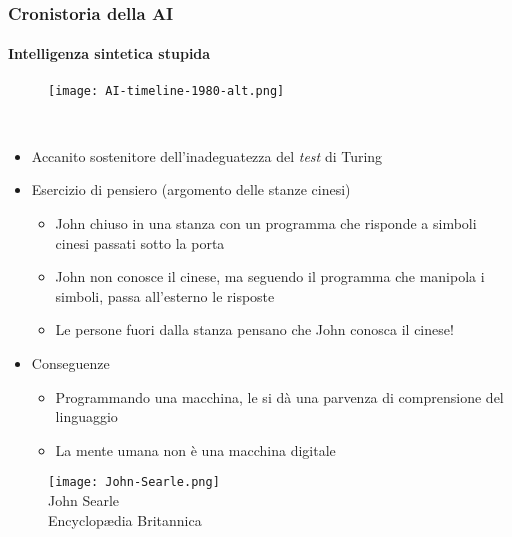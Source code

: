 %
\begin{frame}[t] \frametitle{Cronistoria della AI}
{\scriptsize
{}
\framesubtitle{Intelligenza sintetica stupida}
\vspace*{-.5cm}
	\begin{minipage}[t]{\textwidth}
		\begin{figure}[ht]
			\centering
			\texttt{[image: AI-timeline-1980-alt.png]}
		\end{figure}
	\end{minipage}
	\\\vspace*{.3cm}
	\begin{minipage}[t]{\textwidth}
		\begin{minipage}[t]{0.6\textwidth}
			\begin{itemize}[leftmargin=10pt,align=right]
				\onslide<2->\item[\alert{\faHandORight}] Accanito sostenitore dell'inadeguatezza del \emph{test} di Turing
				\onslide<3->\item[\alert{\faHandORight}] Esercizio di pensiero (\alert{argomento delle stanze cinesi})
				\onslide<4->\begin{itemize}[leftmargin=10pt,align=right]
								\item[\alert{\faHandORight}] John chiuso in una stanza con un programma che risponde a simboli cinesi passati sotto la porta
								\item[\alert{\faHandORight}] John non conosce il cinese, ma seguendo il programma che manipola i simboli, passa all'esterno le risposte
								\item[\alert{\faHandORight}] Le persone fuori dalla stanza pensano che John conosca il cinese!
				\end{itemize}
				\item[\alert{\faHandORight}] Conseguenze
				\begin{itemize}[leftmargin=10pt,align=right]
					\item[\alert{\faHandORight}] Programmando una macchina, le si dà una \alert{parvenza} di comprensione del linguaggio
					\item[\alert{\faHandORight}] La mente umana non è una macchina digitale
				\end{itemize}
			\end{itemize}
		\end{minipage}
		\begin{minipage}[t]{0.4\textwidth}
			\centering
			\begin{figure}[ht]
				\texttt{[image: John-Searle.png]}
				\\John Searle\\\textsuperscript{\textcopyright}Encyclopædia Britannica
			\end{figure}
		\end{minipage}
	\end{minipage}
}
\end{frame}